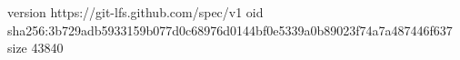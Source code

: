 version https://git-lfs.github.com/spec/v1
oid sha256:3b729adb5933159b077d0c68976d0144bf0e5339a0b89023f74a7a487446f637
size 43840
